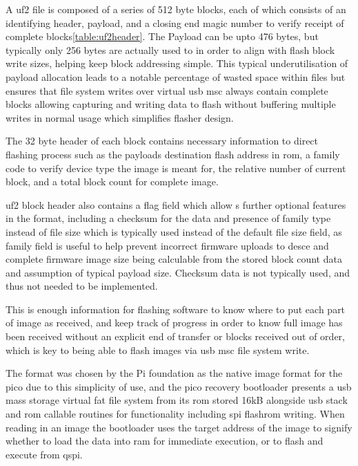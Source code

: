 {A \gls{uf2} file is composed of a series of 512 byte blocks, each of which consists of an identifying header, payload, and a closing end magic number to verify receipt of complete blocks\autoref{table:uf2header}. The Payload can be upto 476 bytes, but typically only 256 bytes are actually used to in order to align with flash block write sizes, helping keep block addressing simple. This typical underutilisation of payload allocation leads to a notable percentage of wasted space within files but ensures that file system writes over virtual \gls{usb} \gls{msc} always contain complete blocks\cite{USBFlashingFormat2023} allowing capturing and writing data to flash without buffering multiple writes in normal usage which simplifies flasher design. 

The 32 byte header of each block contains necessary information to direct flashing process such as the payloads destination flash address in \gls{rom}, a family code to verify device type the image is meant for, the relative number of current block, and a total block count for complete image.

\gls{uf2} block header also contains a flag field which allow s further optional features in the format, including a checksum for the data and presence of family type instead of file size which is typically used instead of the default file size field, as family field is useful to help prevent incorrect firmware uploads to desce and complete firmware image size being calculable from the stored block count data and assumption of typical payload size. Checksum data is not typically used, and thus not needed to be implemented.

This is enough information for flashing software to know where to put each part of image as received, and keep track of progress in order to know full image has been received without an explicit end of transfer or blocks received out of order, which is key to being able to flash images via \gls{usb} \gls{msc} file system write.

The format was chosen by the Pi foundation as the native image format for the pico due to this simplicity of use, and the pico recovery bootloader presents a \gls{usb} mass storage virtual \gls{fat} file system from its \gls{rom} stored 16kB alongside \gls{usb} stack and \gls{rom} callable routines for functionality including \gls{spi} flashrom writing. When reading in an image the bootloader uses the target address of the image to signify whether to load the data into ram for immediate execution, or to flash and execute from \gls{qspi}.

}
